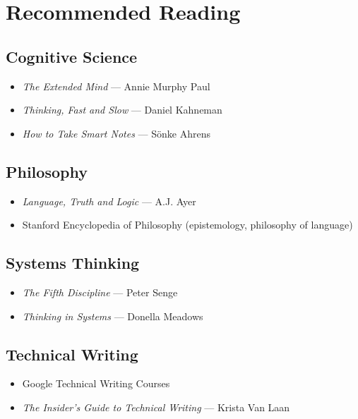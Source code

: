 \chapter{Recommended Reading}

\section{Cognitive Science}

\begin{itemize}
    \item \emph{The Extended Mind} --- Annie Murphy Paul
    \item \emph{Thinking, Fast and Slow} --- Daniel Kahneman
    \item \emph{How to Take Smart Notes} \cite{ahrens2017take} --- S{\"o}nke Ahrens
\end{itemize}

\section{Philosophy}

\begin{itemize}
    \item \emph{Language, Truth and Logic} --- A.J. Ayer
    \item Stanford Encyclopedia of Philosophy (epistemology, philosophy of language)
\end{itemize}

\section{Systems Thinking}

\begin{itemize}
    \item \emph{The Fifth Discipline} --- Peter Senge
    \item \emph{Thinking in Systems} --- Donella Meadows
\end{itemize}

\section{Technical Writing}

\begin{itemize}
    \item Google Technical Writing Courses
    \item \emph{The Insider's Guide to Technical Writing} --- Krista Van Laan
\end{itemize}

